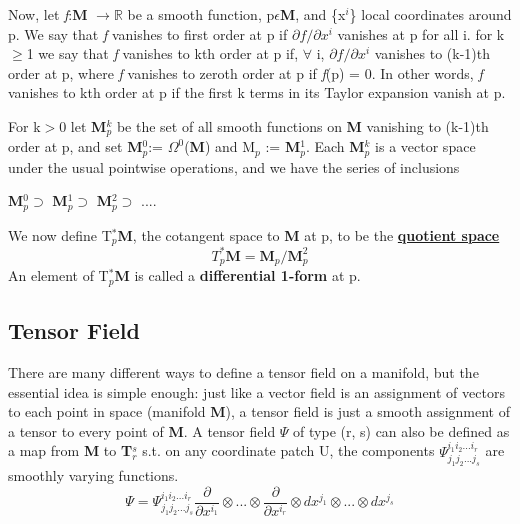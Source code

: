 Now, let \textit{f}:\textbf{M} $\rightarrow \mathbb{R}$ be a smooth function, p$\epsilon$\textbf{M}, and \{x$^i$\} local coordinates around
p. We say that \textit{f} vanishes to first order at p if $\partial f /\partial x^i$ vanishes at p for all i.
for k$\geq$1 we say that \textit{f} vanishes to kth order at p if, $\forall$ i, $\partial f /\partial x^i$ vanishes to (k-1)th order at p,
where \textit{f} vanishes to zeroth order at p if \textit{f}(p) = 0. 
In other words, \textit{f} vanishes to kth order at p if the first k terms in its Taylor expansion vanish at p.

For k$>$0 let \textbf{M}$^k_p$ be the set of all smooth functions on \textbf{M} vanishing to (k-1)th order at p, 
and set \textbf{M}$^0_p$:= $\Omega^0$(\textbf{M}) and M$_p$ := \textbf{M}$^1_p$. Each \textbf{M}$^k_p$ is a vector
space under the usual pointwise operations, and we have the series of inclusions
\begin{center}
    \textbf{M}$^0_p \supset$ \textbf{M}$^1_p \supset$ \textbf{M}$^2_p \supset$ ....    
\end{center}

We now define T$_p^*$\textbf{M}, the cotangent space to \textbf{M} at p, to be the
\href{https://www.youtube.com/watch?v=nh-YgZph-r4}{\textbf{quotient space}} 
\begin{equation}
    T_p^*\textbf{M} = \textbf{M}_p/\textbf{M}^2_p
\end{equation}
An element of T$_p^*$\textbf{M} is called a \textbf{differential 1-form} at p.

\subsection{Tensor Field}
There are many different ways to define a tensor field on a manifold, but the essential idea is simple enough: 
just like a vector field is an assignment of vectors to each point in space (manifold \textbf{M}), a tensor field is just a smooth assignment of a tensor to every point of \textbf{M}.  
A tensor field $\Psi$ of type (r, s) can also be defined as a map from \textbf{M} to \textbf{T}$^s_r$ s.t. on any coordinate
patch U, the components $\Psi^{i_1 i_2...i_r}_{j_1 j_2...j_s}$ are smoothly varying functions. 
\begin{equation}
    \Psi = \Psi^{i_1 i_2...i_r}_{j_1 j_2...j_s} \frac{\partial}{\partial x^{i_1}} \otimes ... \otimes \frac{\partial}{\partial x^{i_r}} \otimes dx^{j_1} \otimes ... \otimes dx^{j_s}
\end{equation}

